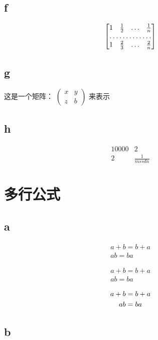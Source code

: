 \documentclass{article}
\begin{document}
	\subsection{f}
	\[
	\begin{bmatrix}
		1 & \frac{1}{2} & \dots & \frac{1}{n}\\
		\hdotsfor{4}\\
		1 & \frac{2}{3} & \dots & \frac{2}{n}
	\end{bmatrix}
	\]
	\subsection{g}
这是一个矩阵：
	\begin{math}
		\left(
		\begin{smallmatrix}
			x&y\\z&b
		\end{smallmatrix}
		\right)
	\end{math}
来表示
	\subsection{h}
	\[
	\begin{array}{c|c}
		10000&2\\
		\hline
		2&\frac{1}{mssdn}
	\end{array}
	\]
	
	\section{多行公式}
	\subsection{a}
	\begin{gather} %
		a+b=b+a\\
		ab=ba
	\end{gather}
	
	\begin{gather*}
	a+b=b+a\\
	ab=ba
	\end{gather*}

	\begin{gather}
		a+b=b+a \notag \\
		ab=ba \notag
	\end{gather}

	\subsection{b}
	
\end{document}
